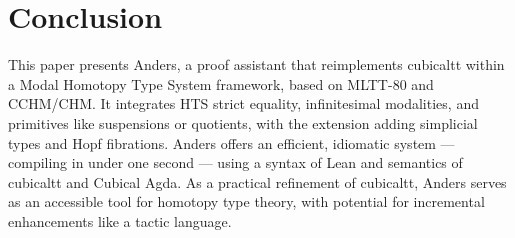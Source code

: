 \documentclass{article}
\theoremstyle{definition}
\begin{document}
\section{Conclusion}

This paper presents Anders, a proof assistant that reimplements
cubicaltt within a Modal Homotopy Type System framework, based
on MLTT-80 and CCHM/CHM. It integrates HTS strict equality,
infinitesimal modalities, and primitives like suspensions or quotients,
with the extension adding simplicial types and Hopf fibrations.
Anders offers an efficient, idiomatic system — compiling in under
one second — using a syntax of Lean and semantics of cubicaltt and Cubical Agda.
As a practical refinement of cubicaltt, Anders serves as an accessible
tool for homotopy type theory, with potential for incremental
enhancements like a tactic language.
\end{document}
